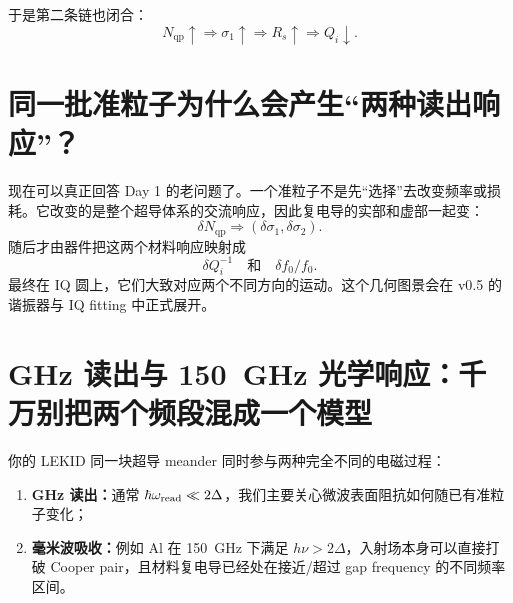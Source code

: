 \documentclass[11pt,a4paper,openany]{ctexrep}
\newcommand{\qp}{\mathrm{qp}}
\begin{document}
于是第二条链也闭合：
\[
N_{\qp}\uparrow
\Rightarrow
\sigma_1\uparrow
\Rightarrow
R_s\uparrow
\Rightarrow
Q_i\downarrow.
\]

\begin{center}
\end{center}

\section{同一批准粒子为什么会产生“两种读出响应”？}

现在可以真正回答 Day 1 的老问题了。一个准粒子不是先“选择”去改变频率或损耗。它改变的是整个超导体系的交流响应，因此复电导的实部和虚部一起变：
\[
\delta N_{\qp}
\Rightarrow
\left(\delta\sigma_1,\delta\sigma_2\right).
\]
随后才由器件把这两个材料响应映射成
\[
\boxed{
\delta Q_i^{-1}
\quad\text{和}\quad
\delta f_0/f_0.
}
\]
最终在 IQ 圆上，它们大致对应两个不同方向的运动。这个几何图景会在 v0.5 的谐振器与 IQ fitting 中正式展开。

\section{GHz 读出与 \SI{150}{GHz} 光学响应：千万别把两个频段混成一个模型}

你的 LEKID 同一块超导 meander 同时参与两种完全不同的电磁过程：
\begin{enumerate}
  \item \textbf{GHz 读出：}通常 $\hbar\omega_{\rm read}\ll2\Delta$，我们主要关心微波表面阻抗如何随已有准粒子变化；
  \item \textbf{毫米波吸收：}例如 Al 在 \SI{150}{GHz} 下满足 $h\nu>2\Delta$，入射场本身可以直接打破 Cooper pair，且材料复电导已经处在接近/超过 gap frequency 的不同频率区间。
\end{enumerate}
\end{document}
